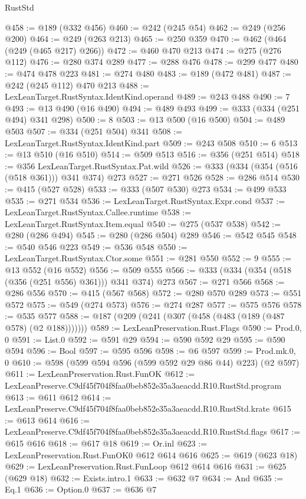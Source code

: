 \begin{lexlean}{RustStd}
\begin{coremodule}
@458 := @189 (@332 @456)
@460 := @242 (@245 @54)
@462 := @249 (@256 @200)
@464 := @249 (@263 @213)
@465 := @250 @359
@470 := @462 (@464 (@249 (@465 @217) @266))
@472 := @460 @470 @213
@474 := @275 (@276 @112)
@476 := @280 @374 @289
@477 := @288 @476
@478 := @299 @477
@480 := @474 @478 @223
@481 := @274 @480
@483 := @189 (@472 @481)
@487 := @242 (@245 @112) @470 @213
@488 := LexLeanTarget.RustSyntax.IdentKind.operand
@489 := @243 @488
@490 := 7
@493 := @13 @490 (@16 @490)
@494 := @489 @493
@499 := @333 (@334 (@251 @494) @341 @298)
@500 := 8
@503 := @13 @500 (@16 @500)
@504 := @489 @503
@507 := @334 (@251 @504) @341
@508 := LexLeanTarget.RustSyntax.IdentKind.part
@509 := @243 @508
@510 := 6
@513 := @13 @510 (@16 @510)
@514 := @509 @513
@516 := @356 (@251 @514)
@518 := @356 LexLeanTarget.RustSyntax.Pat.wild
@526 := @333 (@334 (@354 (@516 (@518 @361))) @341 @374) @273
@527 := @271 @526
@528 := @286 @514
@530 := @415 (@527 @528)
@533 := @333 (@507 @530) @273
@534 := @499 @533
@535 := @271 @534
@536 := LexLeanTarget.RustSyntax.Expr.cond
@537 := LexLeanTarget.RustSyntax.Callee.runtime
@538 := LexLeanTarget.RustSyntax.Item.equal
@540 := @275 (@537 @538)
@542 := @280 (@286 @494)
@545 := @280 (@286 @504) @289
@546 := @542 @545
@548 := @540 @546 @223
@549 := @536 @548
@550 := LexLeanTarget.RustSyntax.Ctor.some
@551 := @281 @550
@552 := 9
@555 := @13 @552 (@16 @552)
@556 := @509 @555
@566 := @333 (@334 (@354 (@518 (@356 (@251 @556) @361))) @341 @374) @273
@567 := @271 @566
@568 := @286 @556
@570 := @415 (@567 @568)
@572 := @280 @570 @289
@573 := @551 @572
@575 := @549 (@274 @573)
@576 := @274 @287
@577 := @575 @576
@578 := @535 @577
@588 := @187 (@209 (@241 (@307 (@458 (@483 (@189 (@487 @578) (@2 @188)))))))
@589 := LexLeanPreservation.Rust.Flags
@590 := Prod.{0, 0}
@591 := List.{0}
@592 := @591 @29
@594 := @590 @592 @29
@595 := @590 @594
@596 := Bool
@597 := @595 @596
@598 := @6 @597
@599 := Prod.mk.{0, 0}
@610 := @598 (@599 @594 @596 (@599 @592 @29 @86 @44) @223) (@2 @597)
@611 := LexLeanPreservation.Rust.FunOK
@612 := LexLeanPreserve.C9df45f704f8faa0beb852e35a3aeacdd.R10.RustStd.program
@613 := @611 @612
@614 := LexLeanPreserve.C9df45f704f8faa0beb852e35a3aeacdd.R10.RustStd.krate
@615 := @613 @614
@616 := LexLeanPreserve.C9df45f704f8faa0beb852e35a3aeacdd.R10.RustStd.flags
@617 := @615 @616
@618 := @617 @18
@619 := Or.inl
@623 := LexLeanPreservation.Rust.FunOK0 @612 @614 @616
@625 := @619 (@623 @18)
@629 := LexLeanPreservation.Rust.FunLoop @612 @614 @616
@631 := @625 (@629 @18)
@632 := Exists.intro.{1}
@633 := @632 @7
@634 := And
@635 := Eq.{1}
@636 := Option.{0}
@637 := @636 @7

\end{coremodule}
\end{lexlean}
